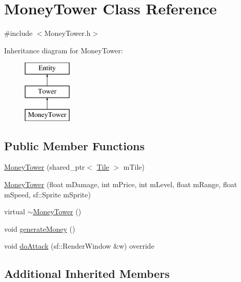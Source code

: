 \hypertarget{class_money_tower}{\section{Money\+Tower Class Reference}
\label{class_money_tower}
}


{\ttfamily \#include $<$Money\+Tower.\+h$>$}

Inheritance diagram for Money\+Tower\+:\begin{figure}[H]
\begin{center}
\leavevmode
\includegraphics[height=3.000000cm]{class_money_tower}
\end{center}
\end{figure}
\subsection*{Public Member Functions}
\begin{DoxyCompactItemize}
\item 
\hyperlink{class_money_tower_a5c30b8e529f104ae8ab8d93392c27dd3}{Money\+Tower} (shared\+\_\+ptr$<$ \hyperlink{class_tile}{Tile} $>$ m\+Tile)
\item 
\hyperlink{class_money_tower_af35fe68ffc562a625aba39da5a07339a}{Money\+Tower} (float m\+Damage, int m\+Price, int m\+Level, float m\+Range, float m\+Speed, sf\+::\+Sprite m\+Sprite)
\item 
virtual \hyperlink{class_money_tower_abaa29f072ec89d2dfed4de83eb980122}{$\sim$\+Money\+Tower} ()
\item 
void \hyperlink{class_money_tower_a7bb3cc062e2d584247857f226283cf22}{generate\+Money} ()
\item 
void \hyperlink{class_money_tower_a83e66451e2e45ab85ffc2fa69ae79192}{do\+Attack} (sf\+::\+Render\+Window \&w) override
\end{DoxyCompactItemize}
\subsection*{Additional Inherited Members}


